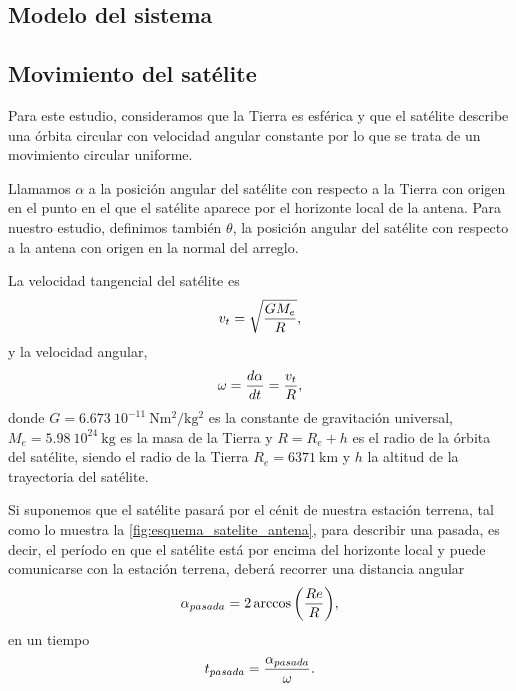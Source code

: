 \documentclass{article}
\newenvironment{standalone}{\begin{preview}}{\end{preview}}
\begin{document}
\begin{standalone}
  \section{Modelo del sistema} \label{sec:modelo-senales}

  \subsection{Movimiento del satélite}

  Para este estudio, consideramos que la Tierra es esférica y que el satélite describe una órbita circular con velocidad angular constante por lo que se trata de un movimiento circular uniforme.

  Llamamos $\alpha$ a la posición angular del satélite con respecto a la Tierra con origen en el punto en el que el satélite aparece por el horizonte local de la antena.
  Para nuestro estudio, definimos también $\theta$, la posición angular del satélite con respecto a la antena con origen en la normal del arreglo.

  La velocidad tangencial del satélite es
  \begin{equation}
    v_t = \sqrt{\frac{G M_e}{R}},
    \tagaddtext{[\si{\meter\per\second}]}
  \end{equation}
  y la velocidad angular,
  \begin{equation}
    \omega = \frac{d\alpha}{dt} = \frac{v_t}{R},
    \tagaddtext{[\si{\radian\per\second}]}
  \end{equation}
  donde $G = 6.673 \ 10^{-11} \ \si{\newton\meter\squared\per\kilo\gram\squared}$ es la constante de gravitación universal, $M_e = 5.98 \ 10^{24} \ \si{\kilo\gram}$ es la masa de la Tierra y $R = R_e + h$ es el radio de la órbita del satélite, siendo el radio de la Tierra $R_e = 6371 \ \si{\kilo\meter}$ y $h$ la altitud de la trayectoria del satélite.

  Si suponemos que el satélite pasará por el cénit de nuestra estación terrena, tal como lo muestra la \cref{fig:esquema_satelite_antena}, para describir una pasada, es decir, el período en que el satélite está por encima del horizonte local y puede comunicarse con la estación terrena, deberá recorrer una distancia angular \cite{ippolitojr2008}
  \begin{equation}
    \alpha_{pasada} = 2 \arccos{ \left( \frac{Re}{R} \right) },
    \tagaddtext{[\si{\radian}]}
  \end{equation}
  en un tiempo
  \begin{equation}
    t_{pasada} = \frac{\alpha_{pasada}}{\omega}.
    \tagaddtext{[\si{\second}]}
  \end{equation}


\end{standalone}
\end{document}
